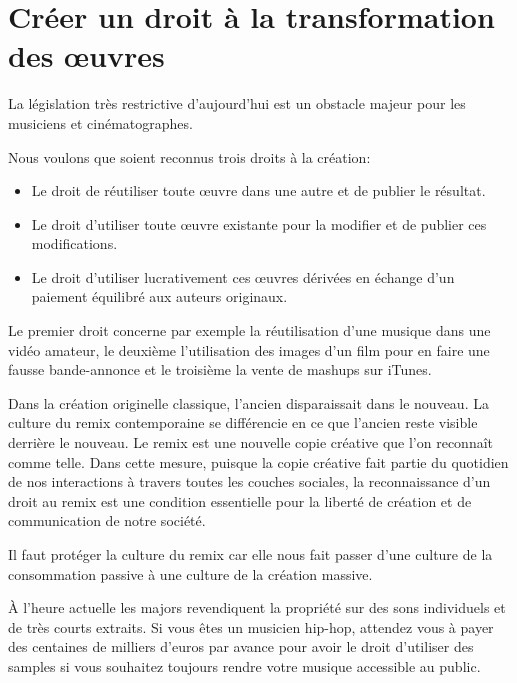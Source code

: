 \chapter{Créer un droit à la transformation des œuvres}\label{remix}

La législation très restrictive d’aujourd’hui est un obstacle majeur pour les musiciens et
cinématographes. 

\begin{mesure}
Nous voulons que soient reconnus trois droits à la création:

\begin{itemize}
\item Le droit de réutiliser toute œuvre dans une autre et de publier le résultat. 
\item Le droit d’utiliser toute œuvre existante pour la modifier et de publier ces modifications. 
\item Le droit d’utiliser lucrativement ces œuvres dérivées en échange d’un paiement équilibré aux auteurs originaux. 
\end{itemize}
\end{mesure}

Le premier droit concerne par exemple la réutilisation d'une musique dans une vidéo amateur, le deuxième l'utilisation des images d'un film pour en faire une fausse bande-annonce et le troisième la vente de mashups sur iTunes.

Dans la création originelle classique, l’ancien disparaissait dans le nouveau. La culture du remix contemporaine se différencie en ce que l’ancien reste visible derrière le nouveau. Le remix est une nouvelle copie créative que l’on reconnaît comme telle. Dans cette mesure, puisque la copie créative fait partie du quotidien de nos interactions à travers toutes les couches sociales, la reconnaissance d’un droit au remix est une condition essentielle pour la liberté de création et de communication de notre société.

Il faut protéger la culture du remix car elle nous fait passer d’une culture de la consommation passive à une culture de la création massive.

À l'heure actuelle les majors revendiquent
la propriété sur des sons individuels et de très courts extraits. Si vous êtes un musicien hip-hop,
attendez vous à payer des centaines de milliers d’euros par avance pour avoir le droit d’utiliser
des samples si vous souhaitez toujours rendre votre musique accessible au public.

